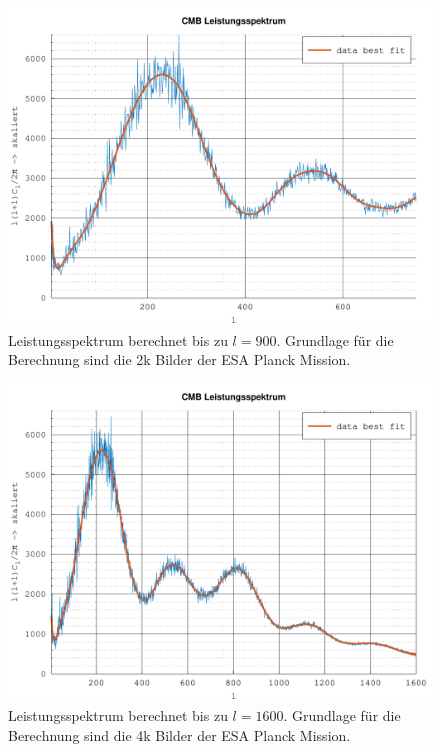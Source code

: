 \begin{figure}
	\centering
	\includegraphics[width=\linewidth]{cmb/data/2k900-500.pdf}
	\caption{Leistungsspektrum berechnet bis zu $l = 900$. Grundlage für die 
		Berechnung sind die 2k Bilder der ESA Planck Mission.}
	\label{fig:cmb-power-spec-900}
\end{figure}

\begin{figure}
	\centering
	\includegraphics[width=\linewidth]{cmb/data/4k1800-500.pdf}
	\caption{Leistungsspektrum berechnet bis zu $l = 1600$. Grundlage für die 
		Berechnung sind die 4k Bilder der ESA Planck Mission.}
	\label{fig:cmb-power-spec-1600}
\end{figure}

